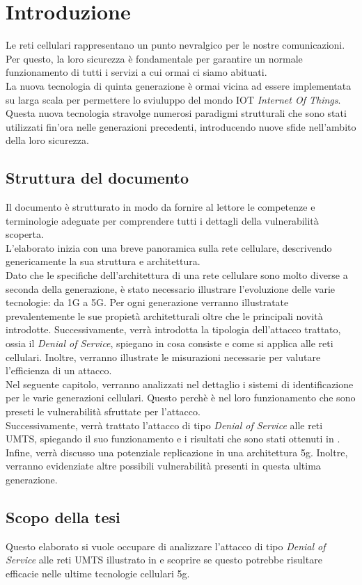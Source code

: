 \chapter{Introduzione}
Le reti cellulari rappresentano un punto nevralgico per le nostre comunicazioni.
Per questo, la loro sicurezza è fondamentale per garantire un normale funzionamento
di tutti i servizi a cui ormai ci siamo abituati.\\
La nuova tecnologia di quinta generazione è ormai vicina ad essere implementata su larga scala
per permettere lo sviuluppo del mondo IOT \textit{Internet Of Things}. Questa nuova tecnologia stravolge numerosi
paradigmi strutturali che sono stati utilizzati fin'ora nelle generazioni precedenti, introducendo nuove sfide nell'ambito
della loro sicurezza.
\section{Struttura del documento}
Il documento è strutturato in modo da fornire al lettore le competenze e terminologie adeguate per comprendere tutti i dettagli della 
vulnerabilità scoperta.\\
L'elaborato inizia con una breve panoramica sulla rete cellulare, descrivendo genericamente la sua struttura e architettura.\\ 
Dato che le specifiche dell'architettura di una rete cellulare sono molto diverse a seconda della generazione, è stato 
necessario illustrare l'evoluzione delle varie tecnologie: da 1G a 5G. 
Per ogni generazione verranno illustratate prevalentemente le sue propietà architetturali oltre che le principali novità introdotte.
Successivamente, verrà introdotta la tipologia dell'attacco trattato, ossia il \textit{Denial of Service}, spiegano in cosa consiste
e come si applica alle reti cellulari. Inoltre, verranno illustrate le misurazioni necessarie per valutare l'efficienza di un attacco.\\
Nel seguente capitolo, verranno analizzati nel dettaglio i sistemi di identificazione per le varie generazioni cellulari. Questo perchè è nel 
loro funzionamento che sono preseti le vulnerabilità sfruttate per l'attacco.\\
Successivamente, verrà trattato l'attacco di tipo \textit{Denial of Service} alle reti UMTS, spiegando il suo funzionamento e i risultati che sono stati
ottenuti in \cite{umts-dos}.
Infine, verrà discusso una potenziale replicazione in una architettura 5g. Inoltre, verranno evidenziate altre possibili vulnerabilità presenti in questa 
ultima generazione.
\section{Scopo della tesi}
Questo elaborato si vuole occupare di analizzare l'attacco di tipo \textit{Denial of Service}
alle reti UMTS illustrato in \cite{umts-dos} e scoprire se questo potrebbe risultare efficacie nelle ultime
tecnologie cellulari 5g.